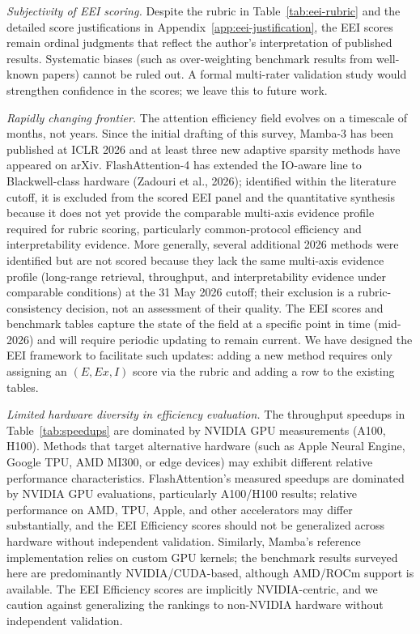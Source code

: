 \documentclass[10pt,twocolumn]{article}
\begin{document}
\textit{Subjectivity of EEI scoring.} Despite the rubric in Table~\ref{tab:eei-rubric} and the detailed score justifications in Appendix~\ref{app:eei-justification}, the EEI scores remain ordinal judgments that reflect the author's interpretation of published results. Systematic biases (such as over-weighting benchmark results from well-known papers) cannot be ruled out. A formal multi-rater validation study would strengthen confidence in the scores; we leave this to future work.

\textit{Rapidly changing frontier.} The attention efficiency field evolves on a timescale of months, not years. Since the initial drafting of this survey, Mamba-3 has been published at ICLR 2026 and at least three new adaptive sparsity methods have appeared on arXiv. FlashAttention-4 has extended the IO-aware line to Blackwell-class hardware (Zadouri et al., 2026); identified within the literature cutoff, it is excluded from the scored EEI panel and the quantitative synthesis because it does not yet provide the comparable multi-axis evidence profile required for rubric scoring, particularly common-protocol efficiency and interpretability evidence. More generally, several additional 2026 methods were identified but are not scored because they lack the same multi-axis evidence profile (long-range retrieval, throughput, and interpretability evidence under comparable conditions) at the 31 May 2026 cutoff; their exclusion is a rubric-consistency decision, not an assessment of their quality. The EEI scores and benchmark tables capture the state of the field at a specific point in time (mid-2026) and will require periodic updating to remain current. We have designed the EEI framework to facilitate such updates: adding a new method requires only assigning an $(E, \mathit{Ex}, I)$ score via the rubric and adding a row to the existing tables.

\textit{Limited hardware diversity in efficiency evaluation.} The throughput speedups in Table~\ref{tab:speedups} are dominated by NVIDIA GPU measurements (A100, H100). Methods that target alternative hardware (such as Apple Neural Engine, Google TPU, AMD MI300, or edge devices) may exhibit different relative performance characteristics. FlashAttention's measured speedups are dominated by NVIDIA GPU evaluations, particularly A100/H100 results; relative performance on AMD, TPU, Apple, and other accelerators may differ substantially, and the EEI Efficiency scores should not be generalized across hardware without independent validation. Similarly, Mamba's reference implementation relies on custom GPU kernels; the benchmark results surveyed here are predominantly NVIDIA/CUDA-based, although AMD/ROCm support is available. The EEI Efficiency scores are implicitly NVIDIA-centric, and we caution against generalizing the rankings to non-NVIDIA hardware without independent validation.
\end{document}
